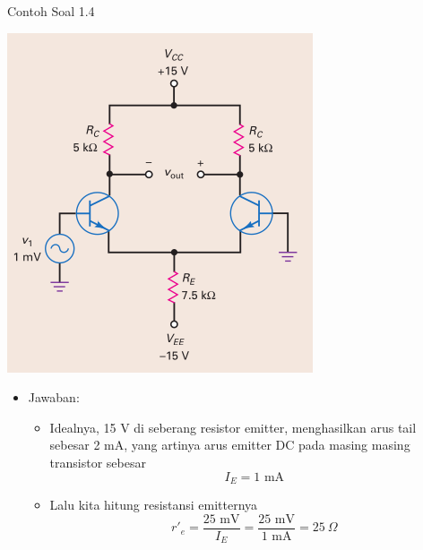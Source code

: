 \documentclass[aspectratio=169]{beamer}
\begin{document}
\begin{frame}{Contoh Soal 1.4}
	\begin{multicols}{2}
		\begin{center}
			\includegraphics[height=0.7\textheight]{gambar/01.contoh_soal_1-2}
		\end{center}
		\columnbreak
		\begin{itemize}
			\item Jawaban:
			\begin{itemize}
				\item Idealnya, 15 V di seberang resistor emitter, menghasilkan arus tail sebesar 2 mA, yang artinya arus emitter DC pada masing masing transistor sebesar
				\[ I_E = 1 \text{ mA} \]
				\item Lalu kita hitung resistansi emitternya
				\[ r'_e = \frac{25 \text{ mV}}{ I_E} =\frac{25 \text{ mV}}{1 \text{ mA}} = 25~\Omega \]
			\end{itemize}
		\end{itemize}
	\end{multicols}
\end{frame}
\end{document}
